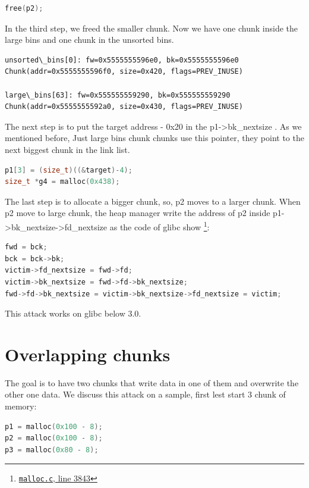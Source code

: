 \documentclass{masterthesis}
\newcommand*\libc{glibc}
\newcommand*\ub{unsorted bins}
\newcommand*\lb{large bins}
\begin{document}
\begin{lstlisting}[language=c,frame=tlrb]
free(p2);
\end{lstlisting}

In the third step, we freed the smaller chunk. Now we have one chunk inside the \lb{} and one chunk in the \ub{}.

\begin{lstlisting}[frame=tlrb]
unsorted\_bins[0]: fw=0x5555555596e0, bk=0x5555555596e0
Chunk(addr=0x5555555596f0, size=0x420, flags=PREV_INUSE)

large\_bins[63]: fw=0x555555559290, bk=0x555555559290
Chunk(addr=0x5555555592a0, size=0x430, flags=PREV_INUSE)
 \end{lstlisting}
 
The next step is to put the target address - 0x20 in the p1->bk\_nextsize . As we mentioned before, Just \lb{} chunk chunks use this pointer, they point to the next biggest chunk in the link list.

\begin{lstlisting}[language=c,frame=tlrb]
p1[3] = (size_t)((&target)-4);
size_t *g4 = malloc(0x438);
\end{lstlisting}
 
The last step is to allocate a bigger chunk, so, p2 moves to a larger chunk. When p2 move to large chunk, the heap manager write the address of p2 inside p1->bk\_nextsize->fd\_nextsize as the code of \libc{} show \footnote{\href{https://sourceware.org/git/?p=glibc.git;a=blob;f=malloc/malloc.c;h=f7cd29bc2f93e1082ee77800bd64a4b2a2897055;hb=9ea3686266dca3f004ba874745a4087a89682617\#l3843}{\texttt{malloc.c}, line 3843}}:

\begin{lstlisting}[language=c,frame=tlrb]
fwd = bck;
bck = bck->bk;
victim->fd_nextsize = fwd->fd;
victim->bk_nextsize = fwd->fd->bk_nextsize;
fwd->fd->bk_nextsize = victim->bk_nextsize->fd_nextsize = victim;
 \end{lstlisting}
 
This attack works on \libc{} below 3.0.

\section{Overlapping chunks}
The goal is to have two chunks that write data in one of them and overwrite the other one data. We discuss this attack on a sample, first lest start 3 chunk of memory:

\begin{lstlisting}[language=c,frame=tlrb]
p1 = malloc(0x100 - 8);
p2 = malloc(0x100 - 8);
p3 = malloc(0x80 - 8);
 \end{lstlisting}
\end{document}
